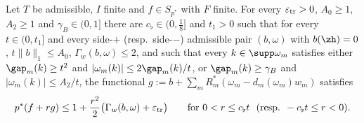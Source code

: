 \begin{lemma}\label{lem:onesidedtransfer}
Let $T$ be admissible, $I$ finite and $f\in S_{p^*}$ with $F$ finite.  For
every $\varepsilon_{\rm tr}>0$, $A_0\ge1$, $A_2\ge1$ and $\gamma_B\in(0,1]$
there are $c_\flat\in(0,\frac18]$ and $t_1>0$ such that for every
$t\in(0,t_1]$ and every side-$+$ \textup{(}resp.\ side-$-$\textup{)}
admissible pair $(b,\omega)$ with $b(\zh)=0$, $t\|b\|_1\le A_0$,
$\Gamma_w(b,\omega)\le2$, and such that every $k\in\supp\omega_m$ satisfies
either $\gap_m(k)\ge t^2$ and $|\omega_m(k)|\le2\gap_m(k)/t$, or
$\gap_m(k)\ge\gamma_B$ and $|\omega_m(k)|\le A_2/t$, the functional
$g:=b+\sum_mR_m^*(\omega_m-d_m(\omega_m)w_m)$ satisfies
\[
 p^*(f+rg)\le1+\frac{r^2}2\big(\Gamma_w(b,\omega)+\varepsilon_{\rm tr}\big)
 \qquad\text{for }0<r\le c_\flat t\ \ \textup{(}\text{resp. }-c_\flat t\le
 r<0\textup{)}.
\]
\end{lemma}

